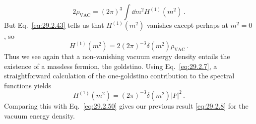 \begin{equation}
  2\rho_{\mathrm{VAC}}
  =(2\pi)^3\int \dd m^2H^{(1)}(m^2)\,.
  \tag{29.2.49}\label{eq:29.2.49}
\end{equation}
But Eq.~\eqref{eq:29.2.43} tells us that \(H^{(1)}(m^2)\) vanishes
except perhaps at \(m^2=0\), so
\begin{equation}
  H^{(1)}(m^2)
  =2(2\pi)^{-3}\delta(m^2)\rho_{\mathrm{VAC}}\,.
  \tag{29.2.50}\label{eq:29.2.50}
\end{equation}
Thus we see again that a non-vanishing vacuum energy density entails the
existence of a massless fermion, the goldstino. Using Eq.~\eqref{eq:29.2.7},
a straightforward calculation of the one-goldstino contribution to the
spectral functions yields
\begin{equation}
  H^{(1)}(m^2)
  =(2\pi)^{-3}\delta(m^2)\lvert F\rvert^2\,.
  \tag{29.2.51}\label{eq:29.2.51}
\end{equation}
Comparing this with Eq.~\eqref{eq:29.2.50} gives our previous result
\eqref{eq:29.2.8} for the vacuum energy density.
